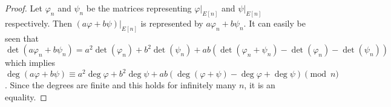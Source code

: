 \begin{proof}
Let $\varphi_n$ and $\psi_n$ be the matrices representing $\varphi\vert_{E[n]}$ and 
$\psi\vert_{E[n]}$ respectively. Then $(a\varphi + b\psi) \vert_{E[n]}$ is represented by 
$a\varphi_n + b\psi_n$. It can easily be seen that $\det(a\varphi_n + b\psi_n) = a^2\det(\varphi_n) 
+ b^2\det(\psi_n) + ab(\det(\varphi_n + \psi_n) - \det(\varphi_n) - \det(\psi_n))$ which implies 
$\deg(a\varphi + b\psi) \equiv a^2\deg \varphi + b^2\deg \psi + ab(\deg(\varphi + \psi) - 
\deg\varphi + \deg\psi) \pmod n$. Since the degrees are finite and this holds for infinitely many 
$n$, it is an equality. 
\end{proof}











